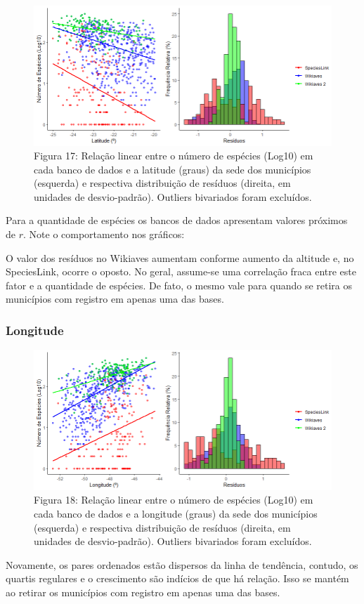 \begin{figure}[h!]
\centering
\includegraphics[width = 15cm]{Imagens/G09.png}
\\{\scriptsize Figura 17: Relação linear entre o número de espécies (Log10) em cada banco de dados e a latitude (graus) da sede dos municípios (esquerda) e respectiva distribuição de resíduos (direita, em unidades de desvio-padrão). Outliers bivariados foram excluídos.}
\end{figure}

\begin{resposta}
Para a quantidade de espécies os bancos de dados apresentam valores próximos de $r$. Note o comportamento nos gráficos:

O valor dos resíduos no Wikiaves aumentam conforme aumento da altitude e, no SpeciesLink, ocorre o oposto. No geral, assume-se uma correlação fraca entre este fator e a quantidade de espécies. De fato, o mesmo vale para quando se retira os municípios com registro em apenas uma das bases.
\end{resposta}

\subsubsection{Longitude}

\begin{figure}[h!]
\centering
\includegraphics[width = 15cm]{Imagens/G10.png}
\\{\scriptsize Figura 18: Relação linear entre o número de espécies (Log10) em cada banco de dados e a longitude (graus) da sede dos municípios (esquerda) e respectiva distribuição de resíduos (direita, em unidades de desvio-padrão). Outliers bivariados foram excluídos.}
\end{figure}

 \begin{resposta}
Novamente, os pares ordenados estão dispersos da linha de tendência, contudo, os quartis regulares e o crescimento são indícios de que há relação. Isso se mantém ao retirar os municípios com registro em apenas uma das bases.
\end{resposta}
